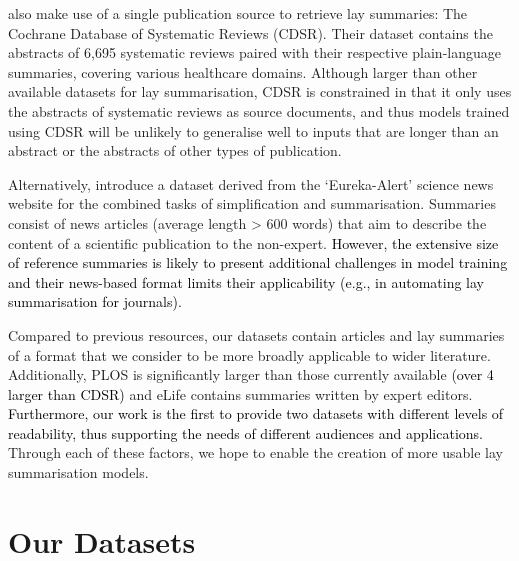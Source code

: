 \documentclass[11pt]{article}
\begin{document}
\citet{Guo2020-ba} also make use of a single publication source to retrieve lay summaries: The Cochrane Database of Systematic Reviews (\textsc{CDSR}). Their dataset contains the abstracts of 6,695 systematic reviews paired with their respective plain-language summaries, covering various healthcare domains.
Although larger than other available datasets for lay summarisation, \textsc{CDSR} is constrained in that it only uses the abstracts of systematic reviews as source documents, and thus models trained using \textsc{CDSR} will be unlikely to generalise well to inputs that are longer than an abstract or the abstracts of other types of publication.



Alternatively, \citet{Zaman2020-kx} introduce a dataset derived from the `Eureka-Alert' science news website for the combined tasks of simplification and summarisation. Summaries consist of news articles (average length > 600 words) that aim to describe the content of a scientific publication to the non-expert. 
\textcolor{black}{However, the extensive size of reference summaries is likely to present additional challenges in model training and their news-based format limits their applicability (e.g., in automating lay summarisation for journals).}

Compared to previous resources, our datasets contain articles and lay summaries of a format that we consider to be more broadly applicable to wider literature. Additionally, PLOS is significantly larger than those currently available \textcolor{black}{(over 4 larger than CDSR)} and eLife contains summaries written by expert editors. 
\textcolor{black}{Furthermore, our work is the first to provide two datasets with different levels of readability, thus supporting the needs of different audiences and applications.}
Through each of these factors, we hope to enable the creation of more usable lay summarisation models.












%
 





\section{Our Datasets} \label{sec:our-datasets}
\end{document}
